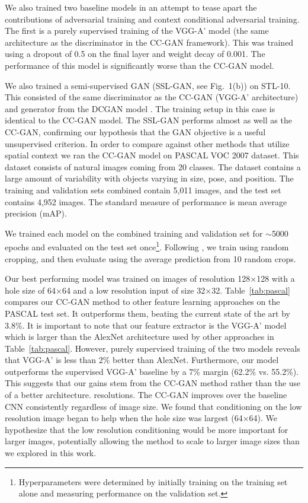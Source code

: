 \documentclass{article} %
\newcommand{\tab}[1]{Table~\ref{tab:#1}}
\begin{document}
We also trained two baseline models in an attempt to tease apart the
contributions of adversarial training and context conditional
adversarial training.  The first is a purely supervised training of
the VGG-A' model (the same architecture as the discriminator in the
CC-GAN framework). This was trained using a dropout of 0.5 on the
final layer and weight decay of 0.001.  The performance of this model is significantly worse than the CC-GAN model.

We also trained a semi-supervised GAN (SSL-GAN, see Fig.~1(b)) on STL-10. This
consisted of the same discriminator as the CC-GAN (VGG-A'
architecture) and generator from the DCGAN model
\citep{radford2016}. The training setup in this case is identical to
the CC-GAN model. The SSL-GAN performs almost as well as the CC-GAN,
confirming our hypothesis that the GAN objective is a useful unsupervised criterion.
In order to compare against other methods that utilize spatial context
we ran the CC-GAN model on PASCAL VOC 2007 dataset.  This dataset
consists of natural images coming from 20 classes.  The dataset
contains a large amount of variability with objects varying in size,
pose, and position.  The training and validation sets combined
contain 5,011 images, and the test set contains 4,952 images. The
standard measure of performance is mean average precision (mAP).

We trained each model on the combined training and validation set for
$\sim$5000 epochs and evaluated on the test set
once\footnote{Hyperparameters were determined by initially training on
  the training set alone and measuring performance on the validation
  set.}. Following \cite{pathak2016}, we train using
random cropping, and then evaluate using the average prediction from
10 random crops.

Our best performing model was trained on images of resolution
128$\times$128 with a hole size of 64$\times$64 and a low resolution
input of size 32$\times$32.  \tab{pascal} compares our CC-GAN method
to other feature learning approaches on the PASCAL test set. It
outperforms them, beating the current state of the art \citep{wang2015} by 3.8\%. It is
important to note that our feature extractor is the VGG-A' model which
is larger than the AlexNet architecture \citep{krizhevsky2012} used by
other approaches in \tab{pascal}.  However, purely supervised training
of the two models reveals that VGG-A' is less than 2\% better than
AlexNet. Furthermore, our model outperforms the supervised VGG-A'
baseline by a 7\% margin (62.2\% vs. 55.2\%).  This suggests that our
gains stem from the CC-GAN method rather than the use of a better
architecture.
resolutions.  The CC-GAN improves over the baseline CNN consistently
regardless of image size.  We found that conditioning on the low
resolution image began to help when the hole size was largest
(64$\times$64).  We hypothesize that the low resolution conditioning
would be more important for larger images, potentially allowing the
method to scale to larger image sizes than we explored in this work.
\end{document}

